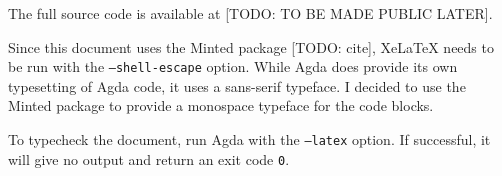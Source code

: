 \documentclass[logo,bsc,singlespacing,parskip,online]{infthesis}
\begin{document}
The full source code is available at [TODO: TO BE MADE PUBLIC LATER].

Since this document uses the Minted package [TODO: cite], XeLaTeX needs to be run with the
\texttt{--shell-escape} option. While Agda does provide its own typesetting of Agda code, it uses a
sans-serif typeface. I decided to use the Minted package to provide a monospace typeface for the
code blocks.

To typecheck the document, run Agda with the \texttt{--latex} option. If successful, it will give no
output and return an exit code \texttt{0}.
\end{document}
